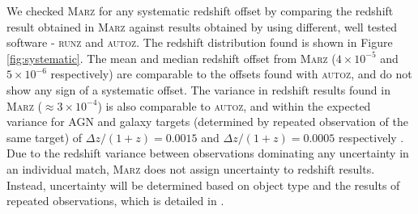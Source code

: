 \documentclass[iop]{emulateapj}
\newcommand{\runz}{\textsc{runz}}
\newcommand{\autoz}{\textsc{autoz}}
\newcommand{\marz}{\textsc{Marz}}
\begin{document}
We checked \marz{} for any systematic redshift offset by comparing the redshift result obtained in \marz{} against results obtained by using different, well tested software - \runz{} and \autoz{}. The redshift distribution found is shown in Figure \ref{fig:systematic}. The mean and median redshift offset from \marz{} ($4\times10^{-5}$ and $5\times10^{-6}$ respectively) are comparable to the offsets found with \autoz{}, and do not show any sign of a systematic offset. The variance in redshift results found in \marz{} ($\approx 3 \times 10^{-4}$) is also comparable to \autoz{}, and within the expected variance for AGN and galaxy targets (determined by repeated observation of the same target) of $\Delta z/(1+z) = 0.0015$ and $\Delta z/(1+z) = 0.0005$ respectively \citep{fang2015}. Due to the redshift variance between observations dominating any uncertainty in an individual match, \marz{} does not assign uncertainty to redshift results. Instead, uncertainty will be determined based on object type and the results of repeated observations, which is detailed in \citet[Table 4]{fang2015}.\\
\end{document}
